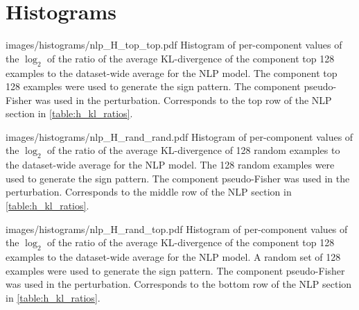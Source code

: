 \documentclass[dvipsnames]{article}
\begin{document}









\section{Histograms}\label{sec:histograms}




\appendixhistogram
{images/histograms/nlp_H_top_top.pdf}
{Histogram of per-component values of the $\log_2$ of the ratio of the average KL-divergence of the component top 128 examples to the dataset-wide average for the NLP model.
The component top 128 examples were used to generate the sign pattern.
The component pseudo-Fisher was used in the perturbation.
Corresponds to the top row of the NLP section in \cref{table:h_kl_ratios}.}

\appendixhistogram
{images/histograms/nlp_H_rand_rand.pdf}
{Histogram of per-component values of the $\log_2$ of the ratio of the average KL-divergence of 128 random examples to the dataset-wide average for the NLP model.
The 128 random examples were used to generate the sign pattern.
The component pseudo-Fisher was used in the perturbation.
Corresponds to the middle row of the NLP section in \cref{table:h_kl_ratios}.}

\appendixhistogram
{images/histograms/nlp_H_rand_top.pdf}
{Histogram of per-component values of the $\log_2$ of the ratio of the average KL-divergence of the component top 128 examples to the dataset-wide average for the NLP model.
A random set of 128 examples were used to generate the sign pattern.
The component pseudo-Fisher was used in the perturbation.
Corresponds to the bottom row of the NLP section in \cref{table:h_kl_ratios}.}
\end{document}
